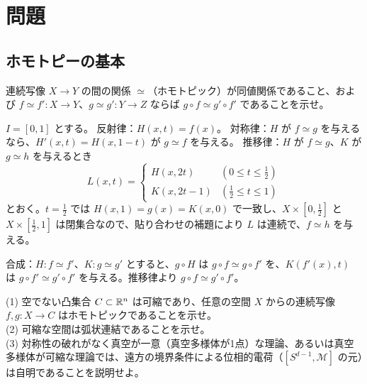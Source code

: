 \section{問題}

\subsection{ホモトピーの基本}

\begin{problem}[難易度 A]\label{ch01-prob-equiv}
連続写像 $X\to Y$ の間の関係 $\simeq$（ホモトピック）が同値関係であること、および $f\simeq f'\colon X\to Y$、$g\simeq g'\colon Y\to Z$ ならば $g\circ f\simeq g'\circ f'$ であることを示せ。
\end{problem}

\begin{solution}
$I=[0,1]$ とする。
反射律：$H(x,t)=f(x)$。
対称律：$H$ が $f\simeq g$ を与えるなら、$H'(x,t)=H(x,1-t)$ が $g\simeq f$ を与える。
推移律：$H$ が $f\simeq g$、$K$ が $g\simeq h$ を与えるとき
\[
L(x,t)=\begin{cases}H(x,2t)&(0\le t\le\tfrac12)\\ K(x,2t-1)&(\tfrac12\le t\le1)\end{cases}
\]
とおく。$t=\tfrac12$ では $H(x,1)=g(x)=K(x,0)$ で一致し、$X\times[0,\tfrac12]$ と $X\times[\tfrac12,1]$ は閉集合なので、貼り合わせの補題により $L$ は連続で、$f\simeq h$ を与える。

合成：$H\colon f\simeq f'$、$K\colon g\simeq g'$ とすると、$g\circ H$ は $g\circ f\simeq g\circ f'$ を、$K(f'(x),t)$ は $g\circ f'\simeq g'\circ f'$ を与える。推移律より $g\circ f\simeq g'\circ f'$。
\end{solution}

\begin{problem}[難易度 A]\label{ch01-prob-convex}
(1) 空でない凸集合 $C\subset\mathbb{R}^n$ は可縮であり、任意の空間 $X$ からの連続写像 $f,g\colon X\to C$ はホモトピックであることを示せ。\\
(2) 可縮な空間は弧状連結であることを示せ。\\
(3) 対称性の破れがなく真空が一意（真空多様体が1点）な理論、あるいは真空多様体が可縮な理論では、遠方の境界条件による位相的電荷（$[S^{d-1},\mathcal{M}]$ の元）は自明であることを説明せよ。
\end{problem}

